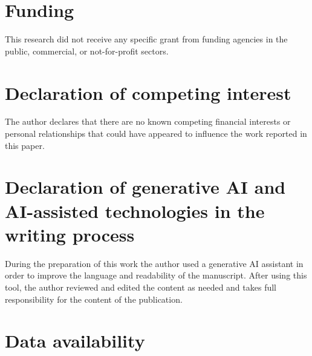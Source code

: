 \documentclass[review,12pt]{elsarticle}
\theoremstyle{plain}
\theoremstyle{definition}
\theoremstyle{remark}
\begin{document}
\section*{Funding}

This research did not receive any specific grant from funding agencies in the public, commercial, or not-for-profit sectors.

\section*{Declaration of competing interest}

The author declares that there are no known competing financial interests or personal relationships that could have appeared to influence the work reported in this paper.

\section*{Declaration of generative AI and AI-assisted technologies in the writing process}

During the preparation of this work the author used a generative AI assistant in order to improve the language and readability of the manuscript. After using this tool, the author reviewed and edited the content as needed and takes full responsibility for the content of the publication.

\section*{Data availability}
\end{document}
